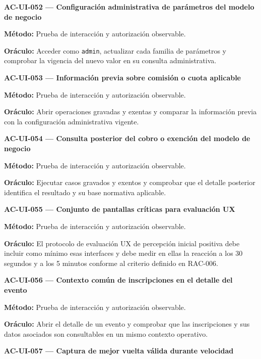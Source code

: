 \documentclass[10pt,letterpaper]{article}
\begin{document}
\noindent\textbf{AC-UI-052 --- Configuración administrativa de parámetros del modelo de negocio}\par
\textbf{Método:} Prueba de interacción y autorización observable.\par
\textbf{Oráculo:} Acceder como \texttt{admin}, actualizar cada familia de parámetros y comprobar la vigencia del nuevo valor en su consulta administrativa.\par\vspace{0.45em}
\noindent\textbf{AC-UI-053 --- Información previa sobre comisión o cuota aplicable}\par
\textbf{Método:} Prueba de interacción y autorización observable.\par
\textbf{Oráculo:} Abrir operaciones gravadas y exentas y comparar la información previa con la configuración administrativa vigente.\par\vspace{0.45em}
\noindent\textbf{AC-UI-054 --- Consulta posterior del cobro o exención del modelo de negocio}\par
\textbf{Método:} Prueba de interacción y autorización observable.\par
\textbf{Oráculo:} Ejecutar casos gravados y exentos y comprobar que el detalle posterior identifica el resultado y su base normativa aplicable.\par\vspace{0.45em}
\noindent\textbf{AC-UI-055 --- Conjunto de pantallas críticas para evaluación UX}\par
\textbf{Método:} Prueba de interacción y autorización observable.\par
\textbf{Oráculo:} El protocolo de evaluación UX de percepción inicial positiva debe incluir como mínimo esas interfaces y debe medir en ellas la reacción a los 30 segundos y a los 5 minutos conforme al criterio definido en RAC-006.\par\vspace{0.45em}
\noindent\textbf{AC-UI-056 --- Contexto común de inscripciones en el detalle del evento}\par
\textbf{Método:} Prueba de interacción y autorización observable.\par
\textbf{Oráculo:} Abrir el detalle de un evento y comprobar que las inscripciones y sus datos asociados son consultables en un mismo contexto operativo.\par\vspace{0.45em}
\noindent\textbf{AC-UI-057 --- Captura de mejor vuelta válida durante velocidad}\par
\end{document}
